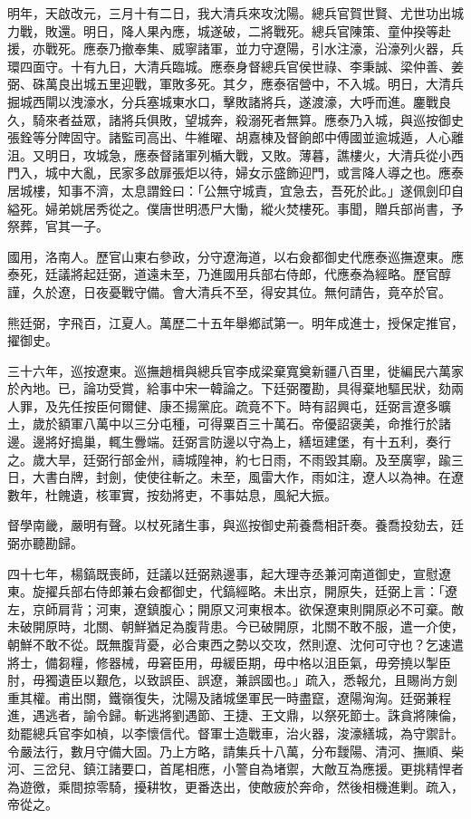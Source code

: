 \begin{pinyinscope}
明年，天啟改元，三月十有二日，我大清兵來攻沈陽。總兵官賀世賢、尤世功出城力戰，敗還。明日，降人果內應，城遂破，二將戰死。總兵官陳策、童仲揆等赴援，亦戰死。應泰乃撤奉集、威寧諸軍，並力守遼陽，引水注濠，沿濠列火器，兵環四面守。十有九日，大清兵臨城。應泰身督總兵官侯世祿、李秉誠、梁仲善、姜弼、硃萬良出城五里迎戰，軍敗多死。其夕，應泰宿營中，不入城。明日，大清兵掘城西閘以洩濠水，分兵塞城東水口，擊敗諸將兵，遂渡濠，大呼而進。鏖戰良久，騎來者益眾，諸將兵俱敗，望城奔，殺溺死者無算。應泰乃入城，與巡按御史張銓等分陴固守。諸監司高出、牛維曜、胡嘉棟及督餉郎中傅國並逾城遁，人心離沮。又明日，攻城急，應泰督諸軍列楯大戰，又敗。薄暮，譙樓火，大清兵從小西門入，城中大亂，民家多啟扉張炬以待，婦女示盛飾迎門，或言降人導之也。應泰居城樓，知事不濟，太息謂銓曰：「公無守城責，宜急去，吾死於此。」遂佩劍印自縊死。婦弟姚居秀從之。僕唐世明憑尸大慟，縱火焚樓死。事聞，贈兵部尚書，予祭葬，官其一子。

國用，洛南人。歷官山東右參政，分守遼海道，以右僉都御史代應泰巡撫遼東。應泰死，廷議將起廷弼，道遠未至，乃進國用兵部右侍郎，代應泰為經略。歷官醇謹，久於遼，日夜憂戰守備。會大清兵不至，得安其位。無何請告，竟卒於官。

熊廷弼，字飛百，江夏人。萬歷二十五年舉鄉試第一。明年成進士，授保定推官，擢御史。

三十六年，巡按遼東。巡撫趙楫與總兵官李成梁棄寬奠新疆八百里，徙編民六萬家於內地。已，論功受賞，給事中宋一韓論之。下廷弼覆勘，具得棄地驅民狀，劾兩人罪，及先任按臣何爾健、康丕揚黨庇。疏竟不下。時有詔興屯，廷弼言遼多曠土，歲於額軍八萬中以三分屯種，可得粟百三十萬石。帝優詔褒美，命推行於諸邊。邊將好搗巢，輒生釁端。廷弼言防邊以守為上，繕垣建堡，有十五利，奏行之。歲大旱，廷弼行部金州，禱城隍神，約七日雨，不雨毀其廟。及至廣寧，踰三日，大書白牌，封劍，使使往斬之。未至，風雷大作，雨如注，遼人以為神。在遼數年，杜餽遺，核軍實，按劾將吏，不事姑息，風紀大振。

督學南畿，嚴明有聲。以杖死諸生事，與巡按御史荊養喬相訐奏。養喬投劾去，廷弼亦聽勘歸。

四十七年，楊鎬既喪師，廷議以廷弼熟邊事，起大理寺丞兼河南道御史，宣慰遼東。旋擢兵部右侍郎兼右僉都御史，代鎬經略。未出京，開原失，廷弼上言：「遼左，京師肩背；河東，遼鎮腹心；開原又河東根本。欲保遼東則開原必不可棄。敵未破開原時，北關、朝鮮猶足為腹背患。今已破開原，北關不敢不服，遣一介使，朝鮮不敢不從。既無腹背憂，必合東西之勢以交攻，然則遼、沈何可守也？乞速遣將士，備芻糧，修器械，毋窘臣用，毋緩臣期，毋中格以沮臣氣，毋旁撓以掣臣肘，毋獨遺臣以艱危，以致誤臣、誤遼，兼誤國也。」疏入，悉報允，且賜尚方劍重其權。甫出關，鐵嶺復失，沈陽及諸城堡軍民一時盡竄，遼陽洶洶。廷弼兼程進，遇逃者，諭令歸。斬逃將劉遇節、王捷、王文鼎，以祭死節士。誅貪將陳倫，劾罷總兵官李如楨，以李懷信代。督軍士造戰車，治火器，浚濠繕城，為守禦計。令嚴法行，數月守備大固。乃上方略，請集兵十八萬，分布靉陽、清河、撫順、柴河、三岔兒、鎮江諸要口，首尾相應，小警自為堵禦，大敵互為應援。更挑精悍者為遊徼，乘間掠零騎，擾耕牧，更番迭出，使敵疲於奔命，然後相機進剿。疏入，帝從之。


\end{pinyinscope}
